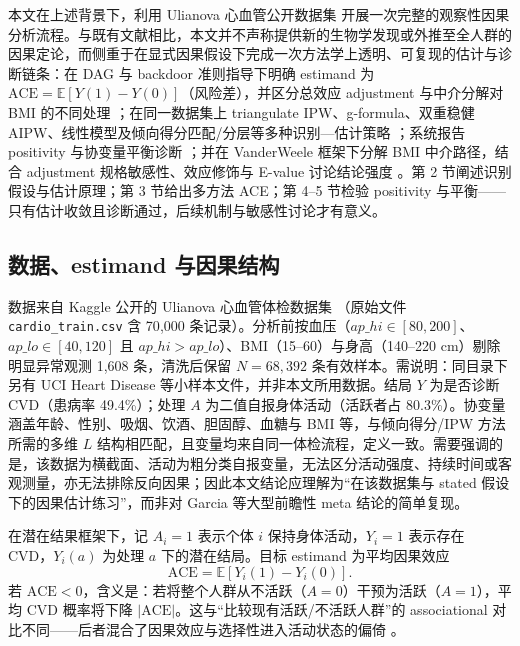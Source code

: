\documentclass[12pt,a4paper]{article}
\newcommand{\E}{\mathbb{E}}
\begin{document}
本文在上述背景下，利用 Ulianova 心血管公开数据集 \cite{ulianova2019kaggle} 开展一次完整的观察性因果分析流程。与既有文献相比，本文并不声称提供新的生物学发现或外推至全人群的因果定论，而侧重于在显式因果假设下完成一次方法学上透明、可复现的估计与诊断链条：在 DAG 与 backdoor 准则指导下明确 estimand 为 $\mathrm{ACE}=\E[Y(1)-Y(0)]$（风险差），并区分总效应 adjustment 与中介分解对 BMI 的不同处理 \cite{hernan2024whatif,vanderweele2015explanation}；在同一数据集上 triangulate IPW、g-formula、双重稳健 AIPW、线性模型及倾向得分匹配/分层等多种识别—估计策略 \cite{hernan2024whatif,rosenbaum1983central,robins1994estimation,shahu2023comparison}；系统报告 positivity 与协变量平衡诊断 \cite{chen2024iptw}；并在 VanderWeele 框架下分解 BMI 中介路径，结合 adjustment 规格敏感性、效应修饰与 E-value 讨论结论强度 \cite{vanderweele2015explanation,vanderweele2017evalue}。第 2 节阐述识别假设与估计原理；第 3 节给出多方法 ACE；第 4–5 节检验 positivity 与平衡——只有估计收敛且诊断通过，后续机制与敏感性讨论才有意义。

\subsection{数据、estimand 与因果结构}

数据来自 Kaggle 公开的 Ulianova 心血管体检数据集 \cite{ulianova2019kaggle}（原始文件 \texttt{cardio\_train.csv} 含 70{,}000 条记录）。分析前按血压（$ap\_hi\in[80,200]$、$ap\_lo\in[40,120]$ 且 $ap\_hi>ap\_lo$）、BMI（15–60）与身高（140–220 cm）剔除明显异常观测 1{,}608 条，清洗后保留 $N=68{,}392$ 条有效样本。需说明：同目录下另有 UCI Heart Disease 等小样本文件，并非本文所用数据。结局 $Y$ 为是否诊断 CVD（患病率 49.4\%）；处理 $A$ 为二值自报身体活动（活跃者占 80.3\%）。协变量涵盖年龄、性别、吸烟、饮酒、胆固醇、血糖与 BMI 等，与倾向得分/IPW 方法所需的多维 $L$ 结构相匹配，且变量均来自同一体检流程，定义一致。需要强调的是，该数据为横截面、活动为粗分类自报变量，无法区分活动强度、持续时间或客观测量，亦无法排除反向因果；因此本文结论应理解为“在该数据集与 stated 假设下的因果估计练习”，而非对 Garcia \cite{garcia2023meta} 等大型前瞻性 meta 结论的简单复现。

在潜在结果框架下，记 $A_i=1$ 表示个体 $i$ 保持身体活动，$Y_i=1$ 表示存在 CVD，$Y_i(a)$ 为处理 $a$ 下的潜在结局。目标 estimand 为平均因果效应
\[
\mathrm{ACE}=\E[Y_i(1)-Y_i(0)].
\]
若 $\mathrm{ACE}<0$，含义是：若将整个人群从不活跃（$A=0$）干预为活跃（$A=1$），平均 CVD 概率将下降 $|\mathrm{ACE}|$。这与“比较现有活跃/不活跃人群”的 associational 对比不同——后者混合了因果效应与选择性进入活动状态的偏倚 \cite{hernan2024whatif}。
\end{document}
